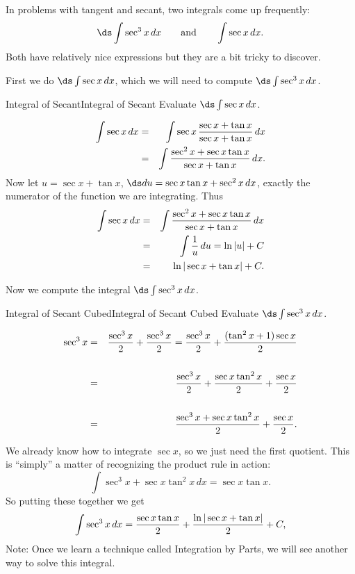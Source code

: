 In problems with tangent and secant, two integrals come up frequently:
$$\ds \int\sec^3x\,dx\qquad\mbox{and}\qquad\int\sec x\,dx.$$
Both have relatively nice expressions but they are a bit tricky to discover. 

First we do $\ds\int\sec x\,dx$, which we
will need to compute $\ds \int\sec^3x\,dx$.

\begin{example}{Integral of Secant}{Integral of Secant}
Evaluate $\ds\int\sec x\,dx$.
\end{example}

\begin{solution}
\begin{eqnarray*}
  \int\sec x\,dx&=&\int\sec x\,{\sec x +\tan x\over \sec x +\tan x}\,dx\cr
  &=&\int{\sec^2 x +\sec x\tan x\over \sec x +\tan x}\,dx.\cr
\end{eqnarray*}
Now let $u=\sec x +\tan x$, $\ds du=\sec x \tan x + \sec^2x\,dx$, exactly
the numerator of the function we are integrating. Thus
\begin{eqnarray*}
  \int\sec x\,dx&=&\int{\sec^2 x +\sec x\tan x\over \sec x +\tan x}\,dx\cr
	&=&\int{1\over u}\,du=\ln |u|+C\cr
  &=&\ln|\sec x +\tan x|+C.
\end{eqnarray*}
\end{solution}

Now we compute the integral $\ds \int\sec^3 x\,dx$.

\begin{example}{Integral of Secant Cubed}{Integral of Secant Cubed}
Evaluate $\ds\int\sec^3 x\,dx$.
\end{example}

\begin{solution}
\begin{eqnarray*}
  \sec^3x&=&{\sec^3x\over2}+{\sec^3x\over2}={\sec^3x\over2}+{(\tan^2x+1)\sec
    x\over 2}\cr
		\\
  &=&{\sec^3x\over2}+{\sec x \tan^2 x\over2}+{\sec x\over 2}\\
	\\
	&=&
  {\sec^3x+\sec x \tan^2x\over 2}+{\sec x\over 2}.
\end{eqnarray*}

We already know how to integrate $\sec x$, so we just need the first
quotient. This is ``simply'' a matter of recognizing the product rule
in action:
$$\int \sec^3x+\sec x \tan^2x\,dx=\sec x \tan x.$$
So putting these together we get 
$$
  \int\sec^3x\,dx={\sec x \tan x\over2}+{\ln|\sec x +\tan x|\over2}+C,
$$
Note: Once we learn a technique called Integration by Parts, we will see another way to solve this integral.
\end{solution}

